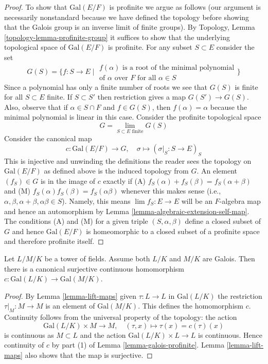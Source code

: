 \begin{proof}
\medskip\noindent
To show that $\text{Gal}(E/F)$ is profinite we argue as follows
(our argument is necessarily nonstandard because we have defined
the topology before showing that the Galois group is an inverse
limit of finite groups).
By Topology, Lemma \ref{topology-lemma-profinite-group}
it suffices to show that the underlying
topological space of $\text{Gal}(E/F)$ is profinite.
For any subset $S \subset E$ consider the set
$$
G(S) = \{ f : S \to E \mid
\begin{matrix}
f(\alpha)\text{ is a root of the minimal polynomial}\\
\text{of }\alpha\text{ over }F\text{ for all }\alpha \in S
\end{matrix}
\}
$$
Since a polynomial has only a finite number of roots we see that
$G(S)$ is finite for all $S \subset E$ finite. If $S \subset S'$
then restriction gives a map $G(S') \to G(S)$. Also, observe
that if $\alpha \in S \cap F$ and $f \in G(S)$, then $f(\alpha) = \alpha$
because the minimal polynomial is linear in this case.
Consider the profinite topological space
$$
G = \lim_{S \subset E\text{ finite}} G(S)
$$
Consider the canonical map
$$
c : \text{Gal}(E/F) \longrightarrow G,\quad
\sigma \longmapsto (\sigma|_S : S \to E)_S
$$
This is injective and unwinding the definitions the
reader sees the topology on $\text{Gal}(E/F)$ as defined above
is the induced topology from $G$. An element $(f_S) \in G$ is in
the image of $c$ exactly if
(A) $f_S(\alpha) + f_S(\beta) = f_S(\alpha + \beta)$ and
(M) $f_S(\alpha)f_S(\beta) = f_S(\alpha\beta)$ whenever
this makes sense (i.e.,
$\alpha, \beta, \alpha + \beta, \alpha\beta \in S$).
Namely, this means
$\lim f_S : E \to E$ will be an $F$-algebra map
and hence an automorphism by
Lemma \ref{lemma-algebraic-extension-self-map}.
The conditions (A) and (M) for a given triple
$(S, \alpha, \beta)$ define a closed subset of
$G$ and hence $\text{Gal}(E/F)$ is homeomorphic
to a closed subset of a profinite space and therefore
profinite itself.
\end{proof}

\begin{lemma}
\label{lemma-galois-infinite}
Let $L/M/K$ be a tower of fields. Assume both $L/K$ and
$M/K$ are Galois. Then there is a canonical surjective continuous
homomorphism $c : \text{Gal}(L/K) \to \text{Gal}(M/K)$.
\end{lemma}

\begin{proof}
By Lemma \ref{lemma-lift-maps} given $\tau : L \to L$ in
$\text{Gal}(L/K)$ the restriction $\tau|_M : M \to M$
is an element of $\text{Gal}(M/K)$. This defines the homomorphism $c$.
Continuity follows from the universal property of the topology:
the action
$$
\text{Gal}(L/K) \times M \longrightarrow M,\quad
(\tau, x) \longmapsto \tau(x) = c(\tau)(x)
$$
is continuous as $M \subset L$ and the action
$\text{Gal}(L/K) \times L \to L$ is continuous.
Hence continuity of $c$ by part (1) of
Lemma \ref{lemma-galois-profinite}.
Lemma \ref{lemma-lift-maps} also
shows that the map is surjective.
\end{proof}

